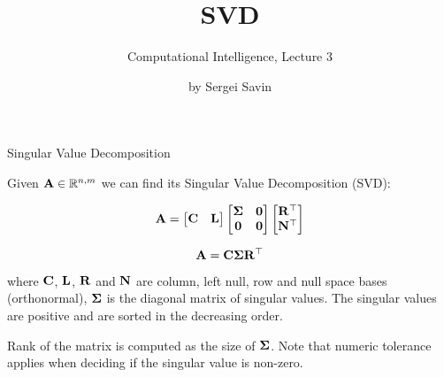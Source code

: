\documentclass{beamer}
\title{SVD}
\subtitle{Computational Intelligence, Lecture 3}
\author{by Sergei Savin}
\date{\mydate}
\begin{document}
\maketitle





\begin{frame}{Singular Value Decomposition}
	\begin{flushleft}
		
		Given $\mathbf{A} \in \mathbb{R}^{n, m}$ we can find its Singular Value Decomposition (SVD):
		
		\begin{equation}
			\mathbf{A} = 
			\begin{bmatrix}
				\mathbf{C} & \mathbf{L}
			\end{bmatrix}
			\begin{bmatrix}
				\mathbf{\Sigma} & \mathbf{0} \\
				\mathbf{0} & \mathbf{0}
			\end{bmatrix}
			\begin{bmatrix}
				\mathbf{R}^\top \\ \mathbf{N}^\top
			\end{bmatrix}
		\end{equation}
		
		\begin{equation}
			\mathbf{A} = 
			\mathbf{C} \mathbf{\Sigma} \mathbf{R}^\top
		\end{equation}
		
		where $\mathbf{C}$, $\mathbf{L}$, $\mathbf{R}$ and $\mathbf{N}$ are column, left null, row and null space bases (orthonormal), $\mathbf{\Sigma}$ is the diagonal matrix of singular values. The singular values are positive and are sorted in the decreasing order.
		
		\bigskip

		Rank of the matrix is computed as the size of $\mathbf{\Sigma}$. Note that numeric tolerance applies when deciding if the singular value is non-zero.
		
	\end{flushleft}
\end{frame}
\end{document}
